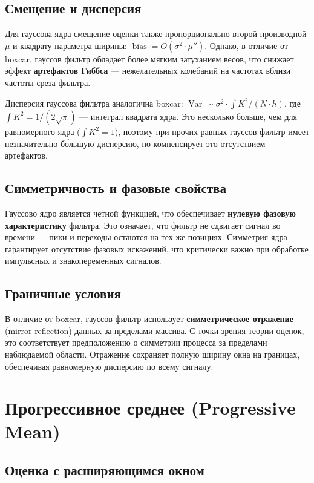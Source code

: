 \documentclass[12pt,a4paper]{article}
\begin{document}
\subsection{Смещение и дисперсия}

Для гауссова ядра смещение оценки также пропорционально второй производной $\mu$ и квадрату параметра ширины: $\operatorname{bias} = O(\sigma^2 \cdot \mu'')$. Однако, в отличие от boxcar, гауссов фильтр обладает более мягким затуханием весов, что снижает эффект \textbf{артефактов Гиббса} --- нежелательных колебаний на частотах вблизи частоты среза фильтра.

Дисперсия гауссова фильтра аналогична boxcar: $\operatorname{Var} \sim \sigma^2 \cdot \int K^2 / (N \cdot h)$, где $\int K^2 = 1/(2\sqrt{\pi})$ --- интеграл квадрата ядра. Это несколько больше, чем для равномерного ядра ($\int K^2 = 1$), поэтому при прочих равных гауссов фильтр имеет незначительно бо́льшую дисперсию, но компенсирует это отсутствием артефактов.

\subsection{Симметричность и фазовые свойства}

Гауссово ядро является чётной функцией, что обеспечивает \textbf{нулевую фазовую характеристику} фильтра. Это означает, что фильтр не сдвигает сигнал во времени --- пики и переходы остаются на тех же позициях. Симметрия ядра гарантирует отсутствие фазовых искажений, что критически важно при обработке импульсных и знакопеременных сигналов.

\subsection{Граничные условия}

В отличие от boxcar, гауссов фильтр использует \textbf{симметрическое отражение} (mirror reflection) данных за пределами массива. С точки зрения теории оценок, это соответствует предположению о симметрии процесса за пределами наблюдаемой области. Отражение сохраняет полную ширину окна на границах, обеспечивая равномерную дисперсию по всему сигналу.

\section{Прогрессивное среднее (Progressive Mean)}

\subsection{Оценка с расширяющимся окном}
\end{document}
